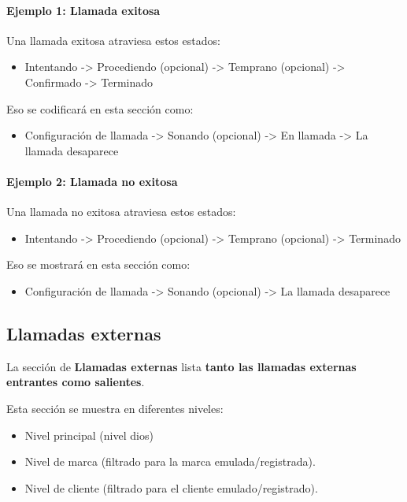 \documentclass[letterpaper,10pt,spanish]{sphinxmanual}
\begin{document}
\paragraph{Ejemplo 1: Llamada exitosa}

Una llamada exitosa atraviesa estos estados:
\begin{itemize}
\item {} 
Intentando -\textgreater{} Procediendo (opcional) -\textgreater{} Temprano (opcional) -\textgreater{} Confirmado -\textgreater{} Terminado

\end{itemize}

Eso se codificará en esta sección como:
\begin{itemize}
\item {} 
Configuración de llamada -\textgreater{} Sonando (opcional) -\textgreater{} En llamada -\textgreater{} La llamada desaparece

\end{itemize}
\paragraph{Ejemplo 2: Llamada no exitosa}

Una llamada no exitosa atraviesa estos estados:
\begin{itemize}
\item {} 
Intentando -\textgreater{} Procediendo (opcional) -\textgreater{} Temprano (opcional) -\textgreater{} Terminado

\end{itemize}

Eso se mostrará en esta sección como:
\begin{itemize}
\item {} 
Configuración de llamada -\textgreater{} Sonando (opcional) -\textgreater{} La llamada desaparece

\end{itemize}


\subsection{Llamadas externas}
\label{administration_portal/brand/calls/external_calls::doc}\label{administration_portal/brand/calls/external_calls:external-calls}
La sección de \textbf{Llamadas externas} lista \textbf{tanto las llamadas externas entrantes como salientes}.

Esta sección se muestra en diferentes niveles:
\begin{itemize}
\item {} 
Nivel principal (nivel dios)

\item {} 
Nivel de marca (filtrado para la marca emulada/registrada).

\item {} 
Nivel de cliente (filtrado para el cliente emulado/registrado).

\end{itemize}
\end{document}
